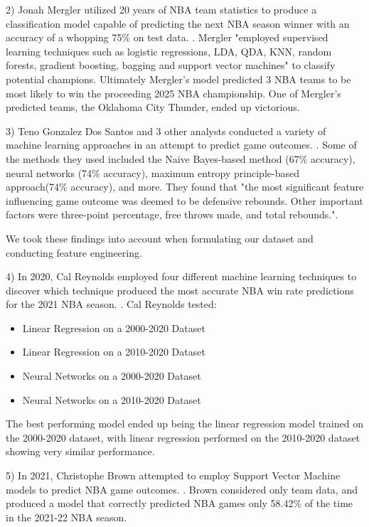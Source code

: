\documentclass[11pt]{article}
\begin{document}
2)  Jonah Mergler utilized 20 years of NBA team statistics to produce a classification model capable of predicting the next NBA season winner with an accuracy of a whopping 75\% on test data. \citep{Mergler2025}. Mergler "employed supervised learning techniques such as logistic regressions, LDA, QDA, KNN, random forests, gradient boosting, bagging and support vector machines" to classify potential champions. Ultimately Mergler's model predicted 3 NBA teams to be most likely to win the proceeding 2025 NBA championship. One of Mergler's predicted teams, the Oklahoma City Thunder, ended up victorious.
\medskip

3)  Teno Gonzalez Dos Santos and 3 other analysts conducted a variety of machine learning approaches in an attempt to predict game outcomes. \citep{GonzalezDosSantos2022}. Some of the methods they used included the Naive Bayes-based method (67\% accuracy), neural networks (74\% accuracy), maximum entropy principle-based approach(74\% accuracy), and more. They found that "the most
significant feature influencing game outcome was deemed to be defensive rebounds. Other important factors were three-point percentage, free throws made, and total rebounds.".

We took these findings into account when formulating our dataset and conducting feature engineering.
\medskip

4)  In 2020, Cal Reynolds employed four different machine learning techniques to discover which technique produced the most accurate NBA win rate predictions for the 2021 NBA season. \citep{Reynolds2021}. Cal Reynolds tested:
\begin{itemize}
\item Linear Regression on a 2000-2020 Dataset
\item Linear Regression on a 2010-2020 Dataset
\item Neural Networks on a 2000-2020 Dataset
\item Neural Networks on a 2010-2020 Dataset
\end{itemize}
The best performing model ended up being the linear regression model trained on the 2000-2020 dataset, with linear regression performed on the 2010-2020 dataset showing very similar performance.
\medskip

5)  In 2021, Christophe Brown attempted to employ Support Vector Machine models to predict NBA game outcomes. \citep{Brown2022}. Brown considered only team data, and produced a model that correctly predicted NBA games only 58.42\% of the time in the 2021-22 NBA season.
\medskip
\end{document}

